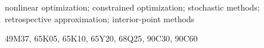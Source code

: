 \documentclass[]{interact}
\theoremstyle{plain}
\begin{document}
\author{Frank E. Curtis
   \and Daniel P.~Robinson}
\date  {\today}


\title{}

\author{
}

\maketitle

\begin{abstract}
  
\end{abstract}

\begin{keywords}
  nonlinear optimization; constrained optimization; stochastic methods; retrospective approximation; interior-point methods
\end{keywords}

\begin{amscode}
  49M37, 65K05, 65K10, 65Y20, 68Q25, 90C30, 90C60
\end{amscode}





\end{document}
